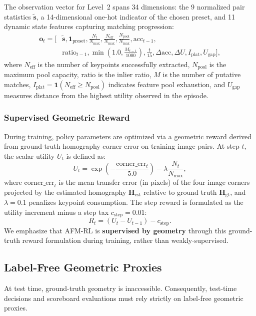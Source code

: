\documentclass[conference]{IEEEtran}
\begin{document}
The observation vector for Level~2 spans 34 dimensions: the 9 normalized pair statistics $\mathbf{\tilde{s}}$, a 14-dimensional one-hot indicator of the chosen preset, and 11 dynamic state features capturing matching progression:
\begin{align}
\mathbf{o}_t = [&\mathbf{\tilde{s}}, \mathbf{1}_{\text{preset}}, \frac{N_t}{N_{\max}}, \frac{N_{\text{eff}}}{N_{\max}}, \frac{N_{\text{pool}}}{N_{\max}}, \text{acc}_{t-1}, \nonumber \\
&\text{ratio}_{t-1}, \min\left(1.0, \frac{M_{t-1}}{1000}\right), \frac{t}{15}, \Delta\text{acc}, \Delta U, I_{\text{plat}}, U_{\text{gap}}],
\end{align}
where $N_{\text{eff}}$ is the number of keypoints successfully extracted, $N_{\text{pool}}$ is the maximum pool capacity, $\text{ratio}$ is the inlier ratio, $M$ is the number of putative matches, $I_{\text{plat}} = \mathbf{1}(N_{\text{eff}} \ge N_{\text{pool}})$ indicates feature pool exhaustion, and $U_{\text{gap}}$ measures distance from the highest utility observed in the episode.

\subsubsection{Supervised Geometric Reward}
During training, policy parameters are optimized via a geometric reward derived from ground-truth homography corner error on training image pairs. At step $t$, the scalar utility $U_t$ is defined as:
\begin{equation}
U_t = \exp\left(-\frac{\text{corner\_err}_t}{5.0}\right) - \lambda \frac{N_t}{N_{\max}},
\end{equation}
where $\text{corner\_err}_t$ is the mean transfer error (in pixels) of the four image corners projected by the estimated homography $\mathbf{H}_{\text{est}}$ relative to ground truth $\mathbf{H}_{\text{gt}}$, and $\lambda = 0.1$ penalizes keypoint consumption. The step reward is formulated as the utility increment minus a step tax $c_{\text{step}} = 0.01$:
\begin{equation}
R_t = (U_t - U_{t-1}) - c_{\text{step}}.
\end{equation}
We emphasize that AFM-RL is \textbf{supervised by geometry} through this ground-truth reward formulation during training, rather than weakly-supervised.

\subsection{Label-Free Geometric Proxies}
At test time, ground-truth geometry is inaccessible. Consequently, test-time decisions and scoreboard evaluations must rely strictly on label-free geometric proxies.
\end{document}
